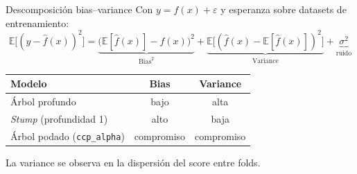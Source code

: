 \documentclass[aspectratio=169,12pt]{beamer}
\newcommand{\hrow}{\rowcolor{mlcream}}
\begin{document}
\begin{frame}{Descomposición bias--variance}
  \small Con $y = f(x) + \varepsilon$ y esperanza sobre datasets de entrenamiento:
  \[ \mathbb{E}\big[(y - \hat{f}(x))^2\big] = \underbrace{\big(\mathbb{E}[\hat{f}(x)] - f(x)\big)^2}_{\text{Bias}^2} + \underbrace{\mathbb{E}\big[(\hat{f}(x) - \mathbb{E}[\hat{f}(x)])^2\big]}_{\text{Variance}} + \underbrace{\sigma^2}_{\text{ruido}} \]
  \centering
  \begin{tabular}{@{}l c c@{}}
    \toprule
    \hrow \textbf{Modelo} & Bias & Variance \\
    \midrule
    Árbol profundo & bajo & alta \\
    \emph{Stump} (profundidad 1) & alto & baja \\
    Árbol podado (\texttt{ccp\_alpha}) & compromiso & compromiso \\
    \bottomrule
  \end{tabular}
  \raggedright
  \begin{keybox}
    La variance se observa en la dispersión del score entre folds.
  \end{keybox}
\end{frame}
\end{document}
